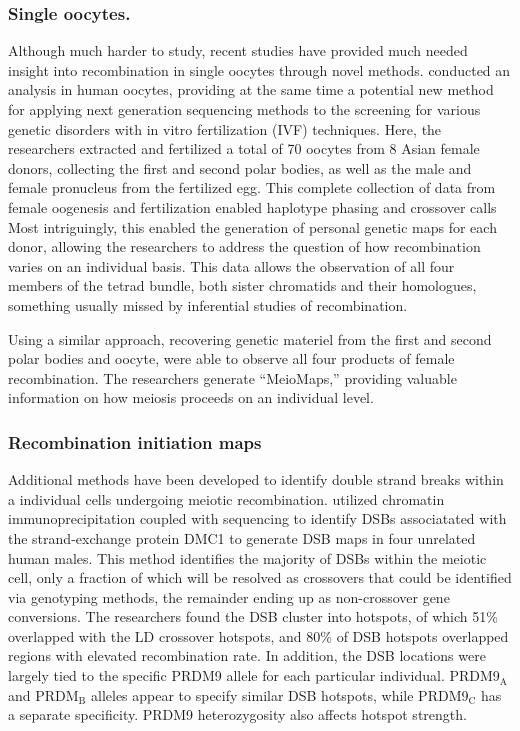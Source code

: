 \subsubsection{Single oocytes.}
Although much harder to study, recent studies have provided much needed insight into recombination in single oocytes through novel methods.
\citet{Hou2013} conducted an analysis in human oocytes, providing at the same time a potential new method for applying next generation sequencing methods to the screening for various genetic disorders with in vitro fertilization (IVF) techniques.
Here, the researchers extracted and fertilized a total of 70 oocytes from 8 Asian female donors, collecting the first and second polar bodies, as well as the male and female pronucleus from the fertilized egg.
This complete collection of data from female oogenesis and fertilization enabled haplotype phasing and crossover calls
Most intriguingly, this enabled the generation of personal genetic maps for each donor, allowing the researchers to address the question of how recombination varies on an individual basis.
This data allows the observation of all four members of the tetrad bundle, both sister chromatids and their homologues, something usually missed by inferential studies of recombination.


Using a similar approach, recovering genetic materiel from the first and second polar bodies and oocyte, \citet{Ottolini2015} were able to observe all four products of female recombination.
The researchers generate ``MeioMaps,'' providing valuable information on how meiosis proceeds on an individual level.



\subsubsection{Recombination initiation maps}
Additional methods have been developed to identify double strand breaks within a individual cells undergoing meiotic recombination.
\citet{Pratto2014} utilized chromatin immunoprecipitation coupled with sequencing to identify DSBs associatated with the strand-exchange protein DMC1 to generate DSB maps in four unrelated human males.
This method identifies the majority of DSBs within the meiotic cell, only a fraction of which will be resolved as crossovers that could be identified via genotyping methods, the remainder ending up as non-crossover gene conversions.
The researchers found the DSB cluster into hotspots, of which 51\% overlapped with the LD crossover hotspots\cite{hapmap2007}, and 80\% of DSB hotspots overlapped regions with elevated recombination rate.
In addition, the DSB locations were largely tied to the specific PRDM9 allele for each particular individual.
PRDM9$_\text{A}$ and PRDM$_\text{B}$ alleles appear to specify similar DSB hotspots, while PRDM9$_\text{C}$ has a separate specificity.
PRDM9 heterozygosity also affects hotspot strength.



